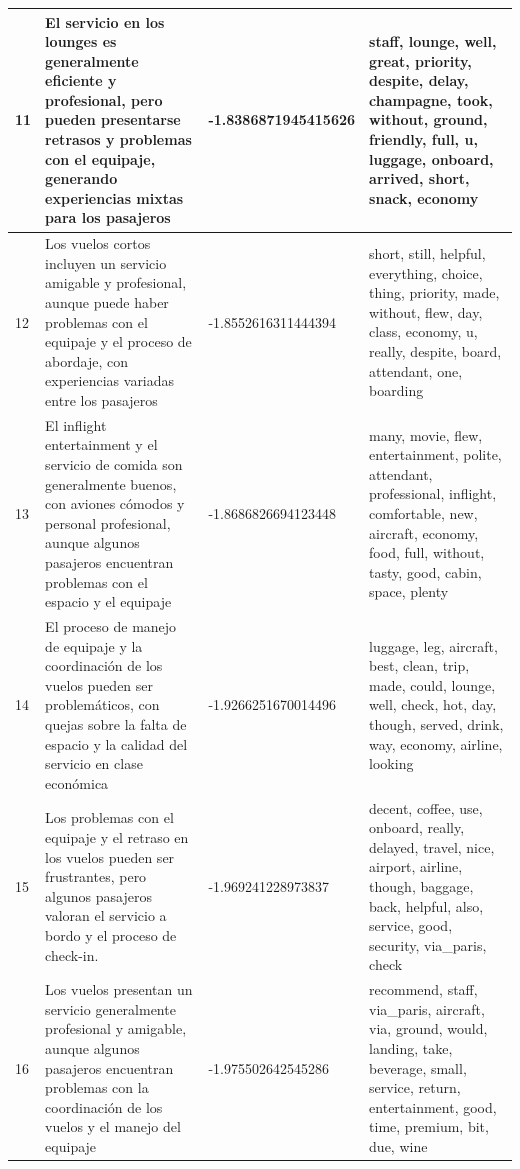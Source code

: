 \documentclass{report}
\begin{document}
{\begin{longtable}{|p{1cm}|p{4cm}|p{4cm}|p{6cm}|}
                    \hline
                    11 & El servicio en los lounges es generalmente eficiente y profesional, pero pueden presentarse retrasos y problemas con el equipaje, generando experiencias mixtas para los pasajeros & -1.8386871945415626 & staff, lounge, well, great, priority, despite, delay, champagne, took, without, ground, friendly, full, u, luggage, onboard, arrived, short, snack, economy \\
                    \hline
                    12 & Los vuelos cortos incluyen un servicio amigable y profesional, aunque puede haber problemas con el equipaje y el proceso de abordaje, con experiencias variadas entre los pasajeros & -1.8552616311444394 & short, still, helpful, everything, choice, thing, priority, made, without, flew, day, class, economy, u, really, despite, board, attendant, one, boarding \\
                    \hline
                    13 & El inflight entertainment y el servicio de comida son generalmente buenos, con aviones cómodos y personal profesional, aunque algunos pasajeros encuentran problemas con el espacio y el equipaje & -1.8686826694123448 & many, movie, flew, entertainment, polite, attendant, professional, inflight, comfortable, new, aircraft, economy, food, full, without, tasty, good, cabin, space, plenty \\
                    \hline
                    14 & El proceso de manejo de equipaje y la coordinación de los vuelos pueden ser problemáticos, con quejas sobre la falta de espacio y la calidad del servicio en clase económica & -1.9266251670014496 & luggage, leg, aircraft, best, clean, trip, made, could, lounge, well, check, hot, day, though, served, drink, way, economy, airline, looking \\
                    \hline
                    15 & Los problemas con el equipaje y el retraso en los vuelos pueden ser frustrantes, pero algunos pasajeros valoran el servicio a bordo y el proceso de check-in. & -1.969241228973837 & decent, coffee, use, onboard, really, delayed, travel, nice, airport, airline, though, baggage, back, helpful, also, service, good, security, via\_paris, check \\
                    \hline
                    16 & Los vuelos presentan un servicio generalmente profesional y amigable, aunque algunos pasajeros encuentran problemas con la coordinación de los vuelos y el manejo del equipaje & -1.975502642545286 & recommend, staff, via\_paris, aircraft, via, ground, would, landing, take, beverage, small, service, return, entertainment, good, time, premium, bit, due, wine \\

\end{longtable}}
\end{document}
